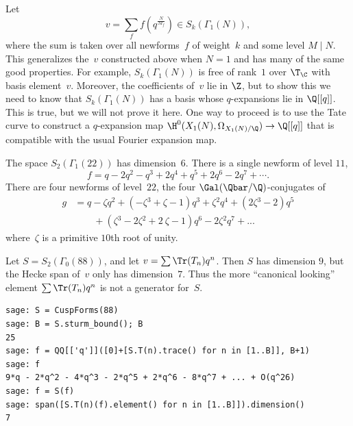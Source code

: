 \documentclass{report}
\begin{document}
Let
\[
  v=\sum_{f} f(q^{\frac{N}{M_f}})\in S_k(\Gamma_1(N)),
\]
where the sum is taken over all newforms~$f$ of weight~$k$ and
some level $M\mid{}N$. This generalizes the~$v$ constructed above
when $N=1$ and has many of the same good properties. For example,
$S_k(\Gamma_1(N))$ is free of rank~$1$ over $\T_{\C}$ with basis
element~$v$.   Moreover, the coefficients of~$v$ lie in $\Z$, but
to show this we need to know that $S_k(\Gamma_1(N))$ has a basis
whose $q$-expansions lie in $\Q[[q]]$.   This is true, but we will
not prove it here.  One way to proceed is to use the Tate curve to
construct a
$q$-expansion map $\H^0(X_1(N),\Omega_{X_1(N)/\Q}) \to \Q[[q]]$
that is compatible with the usual Fourier expansion map.

\begin{example}\label{ex:gamma1_22}
The space $S_2(\Gamma_1(22))$ has dimension~$6$.  There is a
single newform of level $11$,
\[
   f = q - 2q^2 - q^3 + 2q^4 + q^5 + 2q^6 - 2q^7 + \cdots.
\]
There are four newforms of level~$22$, the four
$\Gal(\Qbar/\Q)$-conjugates of%
\begin{align*}
 g &=
q - \zeta{}q^2 + (-\zeta{}^3 + \zeta{} - 1)q^3 + \zeta{}^2q^4 +
(2\zeta{}^3 - 2)q^5 \\
 & \qquad+ (\zeta{}^3 - 2\zeta{}^2 + 2\ \zeta{} -
1)q^6 - 2\zeta{}^2q^7 + ...
\end{align*}
where~$\zeta$ is a primitive $10$th root of unity.
\end{example}

\begin{warning}
Let $S = S_2(\Gamma_0(88))$, and let $v = \sum \Tr(T_n)q^n$.  Then
$S$ has dimension $9$, but the Hecke span of~$v$ only has
dimension~$7$.  Thus the more ``canonical looking'' element $\sum
\Tr(T_n)q^n$ is not a generator for~$S$.
\begin{lstlisting}
sage: S = CuspForms(88)
sage: B = S.sturm_bound(); B
25
sage: f = QQ[['q']]([0]+[S.T(n).trace() for n in [1..B]], B+1)
sage: f
9*q - 2*q^2 - 4*q^3 - 2*q^5 + 2*q^6 - 8*q^7 + ... + O(q^26)
sage: f = S(f)
sage: span([S.T(n)(f).element() for n in [1..B]]).dimension()
7
\end{lstlisting}

\end{warning}
\end{document}
